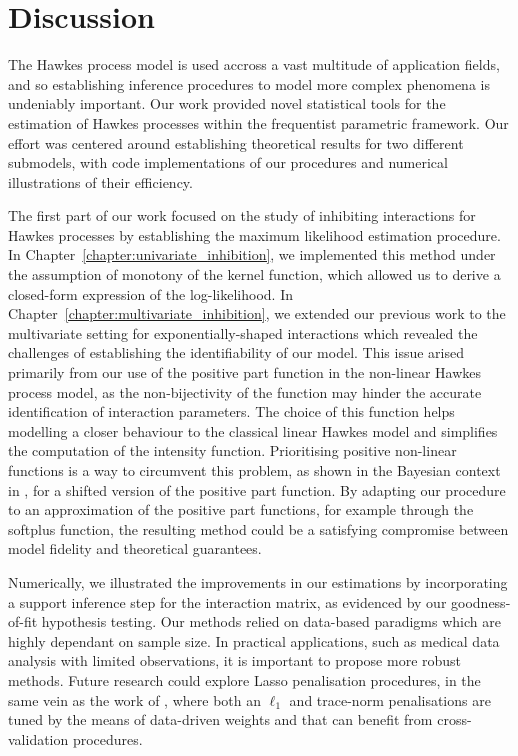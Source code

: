 
\chapter{Discussion}

The Hawkes process model is used accross a vast multitude of application fields, and so establishing inference procedures to model more complex phenomena is undeniably important. 
Our work provided novel statistical tools for the estimation of Hawkes processes within the frequentist parametric framework.
Our effort was centered around establishing theoretical results for two different submodels, with code implementations of our procedures and numerical illustrations of their efficiency. 

\vspace{5mm}


The first part of our work focused on the study of inhibiting interactions for Hawkes processes by establishing the maximum likelihood estimation procedure.
In Chapter~\ref{chapter:univariate_inhibition}, we implemented this method under the assumption of monotony of the kernel function, which allowed us to derive a closed-form expression of the log-likelihood. 
In Chapter~\ref{chapter:multivariate_inhibition}, we extended our previous work to the multivariate setting for exponentially-shaped interactions which revealed the challenges of establishing the identifiability of our model.
This issue arised primarily from our use of the positive part function in the non-linear Hawkes process model, as the non-bijectivity of the function may hinder the accurate identification of interaction parameters.
The choice of this function helps modelling a closer behaviour to the classical linear Hawkes model and simplifies the computation of the intensity function.
Prioritising positive non-linear functions is a way to circumvent this problem, as shown in the Bayesian context in \textcite{Sulem2024}, for a shifted version of the positive part function.
By adapting our procedure to an approximation of the positive part functions, for example through the softplus function, the resulting method could be a satisfying compromise between model fidelity and theoretical guarantees. 

Numerically, we illustrated the improvements in our estimations by incorporating a support inference step for the interaction matrix, as evidenced by our goodness-of-fit hypothesis testing.
Our methods relied on data-based paradigms which are highly dependant on sample size.
In practical applications, such as medical data analysis with limited observations, it is important to propose more robust methods. 
Future research could explore Lasso penalisation procedures, in the same vein as the work of \textcite{Bacry2020}, where both an $\ell_1$ and trace-norm penalisations are tuned by the means of data-driven weights and that can benefit from cross-validation procedures.

